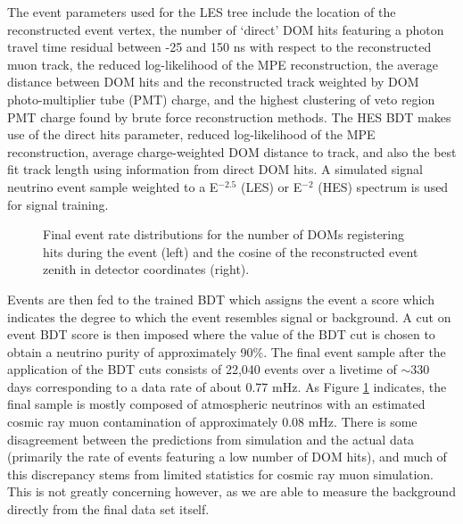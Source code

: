 \documentclass[manuscript]{aastex}
\begin{document}
The event parameters used for the LES tree include the location of the reconstructed event vertex, the number of `direct' DOM hits featuring a photon travel time residual between -25 and 150 ns with respect to the reconstructed muon track, the reduced log-likelihood of the MPE reconstruction, the average distance between DOM hits and the reconstructed track weighted by DOM photo-multiplier tube (PMT) charge, and the highest clustering of veto region PMT charge found by brute force reconstruction methods. The HES BDT makes use of the direct hits parameter, reduced log-likelihood of the MPE reconstruction, average charge-weighted DOM distance to track, and also the best fit track length using information from direct DOM hits. A simulated signal neutrino event sample weighted to a E$^{-2.5}$ (LES) or E$^{-2}$ (HES) spectrum is used for signal training.
\begin{figure}[ht]
\caption[Final Sample Event Parameter Distributions]{Final event rate distributions for the number of DOMs registering hits during the event (left) and the cosine of the reconstructed event zenith in detector coordinates (right).}
\label{fig:PostBDTDistributions}
\end{figure}

Events are then fed to the trained BDT which assigns the event a score which indicates the degree to which the event resembles signal or background. A cut on event BDT score is then imposed where the value of the BDT cut is chosen to obtain a neutrino purity of approximately 90$\%$. The final event sample after the application of the BDT cuts consists of 22,040 events over a livetime of $\sim$330 days corresponding to a data rate of about 0.77 mHz. As Figure \ref{fig:PostBDTDistributions} indicates, the final sample is mostly composed of atmospheric neutrinos with an estimated cosmic ray muon contamination of approximately 0.08 mHz. There is some disagreement between the predictions from simulation and the actual data (primarily the rate of events featuring a low number of DOM hits), and much of this discrepancy stems from limited statistics for cosmic ray muon simulation. This is not greatly concerning however, as we are able to measure the background directly from the final data set itself.
\end{document}

